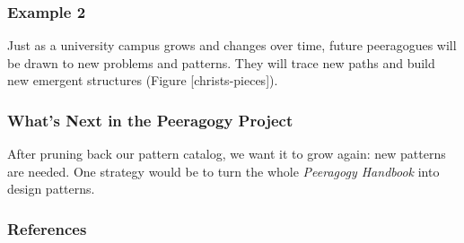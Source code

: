 \hypertarget{example-2}{%
\subsubsection{Example 2}\label{example-2}}

Just as a university campus grows and changes over time, future
peeragogues will be drawn to new problems and patterns. They will trace
new paths and build new emergent structures (Figure
{[}christs-pieces{]}).

\hypertarget{whats-next-in-the-peeragogy-project}{%
\subsubsection{What's Next in the Peeragogy
Project}\label{whats-next-in-the-peeragogy-project}}

After pruning back our pattern catalog, we want it to grow again: new
patterns are needed. One strategy would be to turn the whole
\emph{Peeragogy Handbook} into design patterns.

\hypertarget{references}{%
\subsubsection{References}\label{references}}

